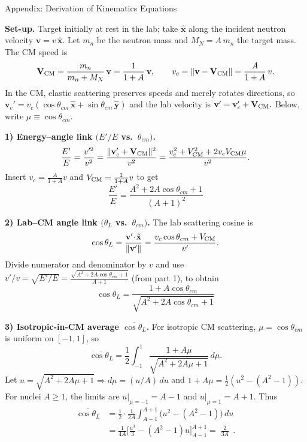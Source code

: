 \documentclass[aspectratio=1610]{beamer}
\begin{document}
\begin{frame}[allowframebreaks]{Appendix: Derivation of Kinematics Equations}
 
\textbf{Set-up.} Target initially at rest in the lab; take $\hat{\mathbf{x}}$ along the incident neutron velocity $\mathbf{v}=v\,\hat{\mathbf{x}}$.
Let $m_n$ be the neutron mass and $M_N=A\,m_n$ the target mass. The CM speed is
\[
\mathbf{V}_{\rm CM}=\frac{m_n}{m_n+M_N}\,\mathbf{v}=\frac{1}{1+A}\,\mathbf{v},
\qquad 
v_c=\|\mathbf{v}-\mathbf{V}_{\rm CM}\|=\frac{A}{1+A}\,v.
\]
In the CM, elastic scattering preserves speeds and merely rotates directions, so
\(
\mathbf{v}_c' = v_c(\cos\theta_{cm}\,\hat{\mathbf{x}}+\sin\theta_{cm}\,\hat{\mathbf{y}})
\)
and the lab velocity is 
\(
\mathbf{v}'=\mathbf{v}_c'+\mathbf{V}_{\rm CM}.
\)
Below, write $\mu\equiv\cos\theta_{cm}$.

\medskip
\textbf{1) Energy–angle link \((E'/E\) vs.\ \(\theta_{cm})\).}
\[
\frac{E'}{E}=\frac{v'^2}{v^2}
=\frac{\|\mathbf{v}_c'+\mathbf{V}_{\rm CM}\|^2}{v^2}
=\frac{v_c^2+V_{\rm CM}^2+2v_cV_{\rm CM}\mu}{v^2}.
\]
Insert \(v_c=\tfrac{A}{1+A}v\) and \(V_{\rm CM}=\tfrac{1}{1+A}v\) to get
\[
\boxed{\;\displaystyle \frac{E'}{E}=\frac{A^2+2A\cos\theta_{cm}+1}{(A+1)^2}\;}
\tag{Rydin 2.18}
\]

\medskip
\textbf{2) Lab–CM angle link \((\theta_L\) vs.\ \(\theta_{cm})\).}
The lab scattering cosine is
\[
\cos\theta_L=\frac{\mathbf{v}'\!\cdot\!\hat{\mathbf{x}}}{\|\mathbf{v}'\|}
=\frac{v_c\cos\theta_{cm}+V_{\rm CM}}{v'}.
\]
Divide numerator and denominator by \(v\) and use
\(
v'/v=\sqrt{E'/E}
=\frac{\sqrt{A^2+2A\cos\theta_{cm}+1}}{A+1}
\)
(from part 1), to obtain
\[
\boxed{\;\displaystyle 
\cos\theta_L=\frac{1+A\cos\theta_{cm}}{\sqrt{A^2+2A\cos\theta_{cm}+1}}\;}
\tag{Rydin 2.21}
\]

\medskip
\textbf{3) Isotropic-in-CM average \(\overline{\cos\theta_L}\).}
For isotropic CM scattering, \(\mu=\cos\theta_{cm}\) is uniform on \([-1,1]\), so
\[
\overline{\cos\theta_L}=\frac{1}{2}\!\int_{-1}^{1}\!
\frac{1+A\mu}{\sqrt{A^2+2A\mu+1}}\,d\mu.
\]
Let \(u=\sqrt{A^2+2A\mu+1}\Rightarrow d\mu=(u/A)\,du\) and
\(1+A\mu=\tfrac{1}{2}(u^2-(A^2-1))\).
For nuclei \(A\ge 1\), the limits are \(u|_{\mu=-1}=A-1\) and \(u|_{\mu=1}=A+1\).
Thus
\begin{align*}
\overline{\cos\theta_L}
&=\frac{1}{2}\cdot\frac{1}{2A}\!\int_{A-1}^{A+1}\!\!\big(u^2-(A^2-1)\big)\,du\\
&=\frac{1}{4A}\Big[\tfrac{u^3}{3}-(A^2-1)u\Big]_{A-1}^{A+1}
=\boxed{\;\displaystyle \frac{2}{3A}\;} \, .
\tag{Rydin 2.56}
\end{align*}


\end{frame}
\end{document}
